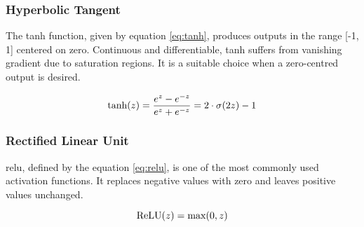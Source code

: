 \subsubsection{Hyperbolic Tangent}
\label{subsub:Tanh}
The \gls{tanh} function, given by equation \ref{eq:tanh}, produces outputs in the range [-1, 1] centered on zero. Continuous and differentiable, tanh suffers from vanishing gradient due to saturation regions. It is a suitable choice when a zero-centred output is desired.

\begin{equation}
    \centering
    \text{tanh}(z) = \frac{e^z - e^{-z}}{e^z + e^{-z}} = 2 \cdot \sigma(2z) - 1
    \label{eq:tanh}
\end{equation}

\subsubsection{Rectified Linear Unit}
\label{subsub:tanh}
\gls{relu}, defined by the equation \ref{eq:relu}, is one of the most commonly used activation functions. It replaces negative values with zero and leaves positive values unchanged.

\begin{equation}
    \centering
    \text{ReLU}(z) = \text{max}(0, z)
    \label{eq:relu}
\end{equation}